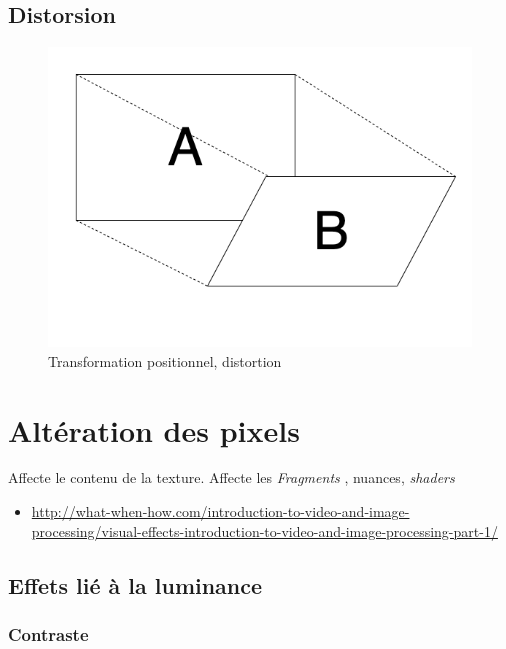 \documentclass[
  french,
]{book}
\providecommand{\tightlist}{%
  \setlength{\itemsep}{0pt}\setlength{\parskip}{0pt}}
\begin{document}
\hypertarget{distorsion}{%
\subsection{Distorsion}\label{distorsion}}

\begin{figure}
\centering
\includegraphics{medias/traiter/figures/dia_transfogeo_distortion.png}
\caption{Transformation positionnel, distortion}
\end{figure}

\hypertarget{altuxe9ration-des-pixels}{%
\section{Altération des pixels}\label{altuxe9ration-des-pixels}}

Affecte le contenu de la texture.
Affecte les \emph{Fragments} , nuances, \emph{shaders}

\begin{itemize}
\tightlist
\item
  \url{http://what-when-how.com/introduction-to-video-and-image-processing/visual-effects-introduction-to-video-and-image-processing-part-1/}
\end{itemize}

\hypertarget{effets-liuxe9-uxe0-la-luminance}{%
\subsection{Effets lié à la luminance}\label{effets-liuxe9-uxe0-la-luminance}}

\hypertarget{contraste}{%
\subsubsection{Contraste}\label{contraste}}
\end{document}
